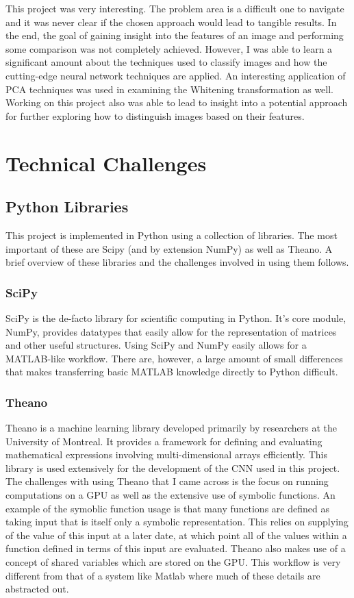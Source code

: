 \documentclass[12pt, titlepage]{article}
\begin{document}
This project was very interesting. The problem area is a difficult one to navigate and it was never clear if the chosen approach would
lead to tangible results. In the end, the goal of gaining insight into the features of an image and performing some comparison was not completely
achieved. However, I was able to learn a significant amount about the techniques used to classify images and how the cutting-edge neural network
techniques are applied. An interesting application of PCA techniques was used in examining the Whitening transformation as well. Working on this
project also was able to lead to insight into a potential approach for further exploring how to distinguish images based on their features.

\section{Technical Challenges}
\subsection{Python Libraries}

This project is implemented in Python using a collection of libraries. The most important of these are Scipy (and
by extension NumPy) as well as Theano. A brief overview of these libraries and the challenges involved in using them
follows. 

  \subsubsection{SciPy}

  SciPy is the de-facto library for scientific computing in Python. It's core module, NumPy, provides datatypes that easily allow for the
  representation of matrices and other useful structures. Using SciPy and NumPy easily allows for a MATLAB-like workflow. There are, however,
  a large amount of small differences that makes transferring basic MATLAB knowledge directly to Python difficult.

  \subsubsection{Theano}
  
  Theano is a machine learning library developed primarily by researchers at the University of Montreal. It provides a framework for defining
  and evaluating mathematical expressions involving multi-dimensional arrays efficiently. This library is used extensively for the development
  of the CNN used in this project. The challenges with using Theano that I came across is the focus on running computations on a GPU as well as
  the extensive use of symbolic functions. An example of the symoblic function usage is that many functions are defined as taking input that is
  itself only a symbolic representation. This relies on supplying of the value of this input at a later date, at which point all of the values
  within a function defined in terms of this input are evaluated. Theano also makes use of a concept of shared variables which are stored on the
  GPU. This workflow is very different from that of a system like Matlab where much of these details are abstracted out.
\end{document}
